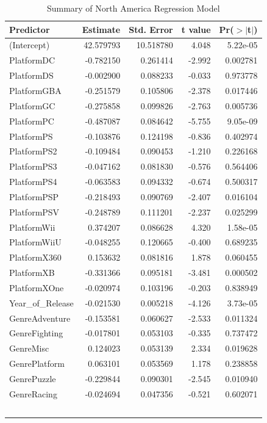 \documentclass[12pt]{article}
\begin{document}
\begin{table}[ht]
  \caption{Summary of North America Regression Model}
  \label{tab:NA}
\centering
\begin{tabular}{lrrrr}
\hline
Predictor & Estimate & Std. Error & t value & Pr($>$$|$t$|$) \\ 
\hline
(Intercept) & 42.579793 & 10.518780 & 4.048 & 5.22e-05 \\
PlatformDC & -0.782150 & 0.261414 & -2.992 & 0.002781 \\
PlatformDS & -0.002900 & 0.088233 & -0.033 & 0.973778 \\
PlatformGBA & -0.251579 & 0.105806 & -2.378 & 0.017446 \\
PlatformGC & -0.275858 & 0.099826 & -2.763 & 0.005736 \\
PlatformPC & -0.487087 & 0.084642 & -5.755 & 9.05e-09 \\
PlatformPS & -0.103876 & 0.124198 & -0.836 & 0.402974 \\
PlatformPS2 & -0.109484 & 0.090453 & -1.210 & 0.226168 \\
PlatformPS3 & -0.047162 & 0.081830 & -0.576 & 0.564406 \\
PlatformPS4 & -0.063583 & 0.094332 & -0.674 & 0.500317 \\
PlatformPSP & -0.218493 & 0.090769 & -2.407 & 0.016104 \\
PlatformPSV & -0.248789 & 0.111201 & -2.237 & 0.025299 \\
PlatformWii & 0.374207 & 0.086628 & 4.320 & 1.58e-05 \\
PlatformWiiU & -0.048255 & 0.120665 & -0.400 & 0.689235 \\
PlatformX360 & 0.153632 & 0.081816 & 1.878 & 0.060455 \\
PlatformXB & -0.331366 & 0.095181 & -3.481 & 0.000502 \\
PlatformXOne & -0.020974 & 0.103196 & -0.203 & 0.838949 \\
Year_of_Release & -0.021530 & 0.005218 & -4.126 & 3.73e-05 \\
GenreAdventure & -0.153581 & 0.060627 & -2.533 & 0.011324 \\
GenreFighting & -0.017801 & 0.053103 & -0.335 & 0.737472 \\
GenreMisc & 0.124023 & 0.053139 & 2.334 & 0.019628 \\
GenrePlatform & 0.063101 & 0.053569 & 1.178 & 0.238858 \\
GenrePuzzle & -0.229844 & 0.090301 & -2.545 & 0.010940 \\
GenreRacing & -0.024694 & 0.047356 & -0.521 & 0.602071 \\
$$
\end{tabular}
\end{table}
\end{document}
